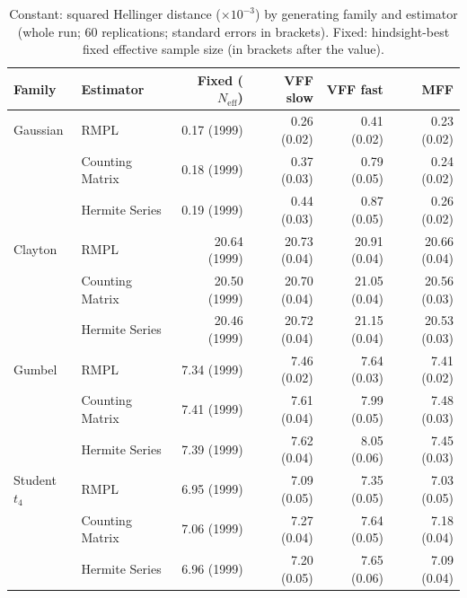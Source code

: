 \begin{table}[htbp]
\centering
\small
\caption{Constant: squared Hellinger distance ($\times10^{-3}$) by generating family and estimator (whole run; 60 replications; standard errors in brackets). Fixed: hindsight-best fixed effective sample size (in brackets after the value).}
\label{tab:app-strategy-h2-constant}
\begin{tabular}{llrrrr}
\toprule
Family & Estimator & Fixed ($N_{\mathrm{eff}}$) & VFF slow & VFF fast & MFF \\
\midrule
Gaussian & RMPL & 0.17 (1999) & 0.26 (0.02) & 0.41 (0.02) & 0.23 (0.02) \\
 & Counting Matrix & 0.18 (1999) & 0.37 (0.03) & 0.79 (0.05) & 0.24 (0.02) \\
 & Hermite Series & 0.19 (1999) & 0.44 (0.03) & 0.87 (0.05) & 0.26 (0.02) \\
\addlinespace
Clayton & RMPL & 20.64 (1999) & 20.73 (0.04) & 20.91 (0.04) & 20.66 (0.04) \\
 & Counting Matrix & 20.50 (1999) & 20.70 (0.04) & 21.05 (0.04) & 20.56 (0.03) \\
 & Hermite Series & 20.46 (1999) & 20.72 (0.04) & 21.15 (0.04) & 20.53 (0.03) \\
\addlinespace
Gumbel & RMPL & 7.34 (1999) & 7.46 (0.02) & 7.64 (0.03) & 7.41 (0.02) \\
 & Counting Matrix & 7.41 (1999) & 7.61 (0.04) & 7.99 (0.05) & 7.48 (0.03) \\
 & Hermite Series & 7.39 (1999) & 7.62 (0.04) & 8.05 (0.06) & 7.45 (0.03) \\
\addlinespace
Student $t_4$ & RMPL & 6.95 (1999) & 7.09 (0.05) & 7.35 (0.05) & 7.03 (0.05) \\
 & Counting Matrix & 7.06 (1999) & 7.27 (0.04) & 7.64 (0.05) & 7.18 (0.04) \\
 & Hermite Series & 6.96 (1999) & 7.20 (0.05) & 7.65 (0.06) & 7.09 (0.04) \\
\bottomrule
\end{tabular}
\end{table}

